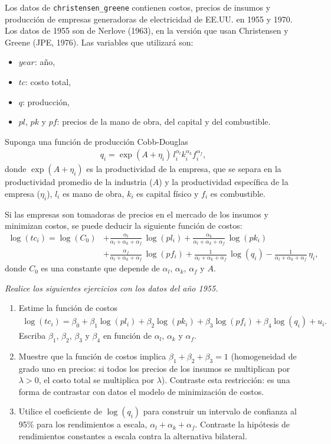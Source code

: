 \documentclass[letterpaper,11pt]{article}
\begin{document}
Los datos de \texttt{christensen\_greene} contienen costos, precios de
insumos y producci\'on de empresas generadoras de electricidad de EE.UU. en 1955 y 1970. Los
datos de 1955 son de Nerlove (1963), en la versi\'on que usan Christensen y Greene (JPE,
1976). Las variables que utilizar\'a son:
\begin{itemize}
    \item $year$: a\~no,
    \item $tc$: costo total,
    \item $q$: producci\'on,
    \item $pl$, $pk$ y $pf$: precios de la mano de obra, del capital y del combustible.
\end{itemize}
Suponga una funci\'on de producci\'on Cobb-Douglas
\begin{align*}
q_i = \exp(A+\eta_i)\, l_i^{\alpha_l} k_i^{\alpha_k} f_i^{\alpha_f},
\end{align*}
donde $\exp(A+\eta_i)$ es la productividad de la empresa, que se separa en la productividad
promedio de la industria ($A$) y la productividad espec\'ifica de la empresa ($\eta_i$),
$l_i$ es mano de obra, $k_i$ es capital f\'isico y $f_i$ es combustible.

Si las empresas son tomadoras de precios en el mercado de los insumos y minimizan costos,
se puede deducir la siguiente funci\'on de costos:
\begin{align*}
\log(tc_i) = \log(C_0) &+ \frac{\alpha_l}{\alpha_l+\alpha_k+\alpha_f} \, \log( pl_i) + \frac{\alpha_k}{\alpha_l+\alpha_k+\alpha_f} \, \log(pk_i) \\
&+ \frac{\alpha_f}{\alpha_l+\alpha_k+\alpha_f} \, \log(pf_i) + \frac{1}{\alpha_l+\alpha_k+\alpha_f} \, \log(q_i) - \frac{1}{\alpha_l+\alpha_k+\alpha_f} \, \eta_i,
\end{align*}
donde $C_0$ es una constante que depende de $\alpha_l$, $\alpha_k$, $\alpha_f$ y $A$.

\emph{Realice los siguientes ejercicios con los datos del a\~no 1955.}
\begin{enumerate}
    \item Estime la funci\'on de costos
    \begin{align*}
    \log(tc_i)=\beta_0+\beta_1 \log(pl_i)+\beta_2 \log(pk_i)+\beta_3 \log(pf_i)+\beta_4 \log(q_i)+u_i.
    \end{align*}
    Escriba $\beta_1$, $\beta_2$, $\beta_3$ y $\beta_4$ en funci\'on de $\alpha_l$,
    $\alpha_k$ y $\alpha_f$.
    \item Muestre que la funci\'on de costos implica
        $\beta_1+\beta_2+\beta_3=1$ (homogeneidad de grado uno en precios: si todos los
        precios de los insumos se multiplican por $\lambda>0$, el costo total se
        multiplica por $\lambda$). Contraste esta restricci\'on: es una forma de contrastar
        con datos el modelo de minimizaci\'on de costos.
    \item Utilice el coeficiente de $\log(q_i)$ para construir un intervalo de
        confianza al 95\% para los rendimientos a escala, $\alpha_l+\alpha_k+\alpha_f$.
        Contraste la hip\'otesis de rendimientos constantes a escala contra la alternativa
        bilateral.
\end{enumerate}
\end{document}
